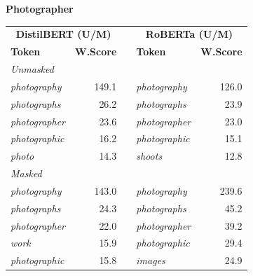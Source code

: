\documentclass[11pt]{article}
\begin{document}
\vspace{4pt}\noindent\textbf{Photographer}
\begin{center}\scriptsize
\begin{tabular}{lrllr}
\toprule
\multicolumn{2}{c}{\textbf{DistilBERT (U/M)}} & & \multicolumn{2}{c}{\textbf{RoBERTa (U/M)}} \\
\textbf{Token} & \textbf{W.Score} & & \textbf{Token} & \textbf{W.Score} \\
\midrule
\multicolumn{5}{l}{\textit{Unmasked}} \\
\emph{photography} & 149.1 & & \emph{photography} & 126.0 \\
\emph{photographs} & 26.2 & & \emph{photographs} & 23.9 \\
\emph{photographer} & 23.6 & & \emph{photographer} & 23.0 \\
\emph{photographic} & 16.2 & & \emph{photographic} & 15.1 \\
\emph{photo} & 14.3 & & \emph{shoots} & 12.8 \\
\multicolumn{5}{l}{\textit{Masked}} \\
\emph{photography} & 143.0 & & \emph{photography} & 239.6 \\
\emph{photographs} & 24.3 & & \emph{photographs} & 45.2 \\
\emph{photographer} & 22.0 & & \emph{photographer} & 39.2 \\
\emph{work} & 15.9 & & \emph{photographic} & 29.4 \\
\emph{photographic} & 15.8 & & \emph{images} & 24.9 \\
\bottomrule
\end{tabular}
\end{center}
\end{document}
